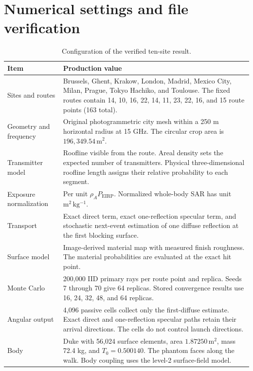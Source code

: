 \section{Numerical settings and file verification}
\label{sec:si-configuration}

\begin{table}[!t]
  \caption{Configuration of the verified ten-site result.}
  \label{tab:si-configuration}
  \centering
  \begin{tabular}{p{}p{}}
    \toprule
    Item & Production value \\
    \midrule
    Sites and routes & Brussels, Ghent, Krakow, London, Madrid, Mexico City, Milan, Prague, Tokyo Hachiko, and Toulouse. The fixed routes contain 14, 10, 16, 22, 14, 11, 23, 22, 16, and 15 route points (163 total). \\
    Geometry and frequency & Original photogrammetric city mesh within a 250 m horizontal radius at 15 GHz. The circular crop area is $196{,}349.54\,\mathrm{m^2}$. \\
    Transmitter model & Roofline visible from the route. Areal density sets the expected number of transmitters. Physical three-dimensional roofline length assigns their relative probability to each segment. \\
    Exposure normalization & Per unit $\rho_A P_{\mathrm{EIRP}}$. Normalized whole-body SAR has unit $\mathrm{m^2\,kg^{-1}}$. \\
    Transport & Exact direct term, exact one-reflection specular term, and stochastic next-event estimation of one diffuse reflection at the first blocking surface. \\
    Surface model & Image-derived material map with measured finish roughness. The material probabilities are evaluated at the exact hit point. \\
    Monte Carlo & 200,000 IID primary rays per route point and replica. Seeds 7 through 70 give 64 replicas. Stored convergence results use 16, 24, 32, 48, and 64 replicas. \\
    Angular output & 4,096 passive cells collect only the first-diffuse estimate. Exact direct and one-reflection specular paths retain their arrival directions. The cells do not control launch directions. \\
    Body & Duke with 56,024 surface elements, area $1.87250\,\mathrm{m^2}$, mass 72.4 kg, and $T_0=0.500140$. The phantom faces along the walk. Body coupling uses the level-2 surface-field model. \\
    \bottomrule
  \end{tabular}
\end{table}

